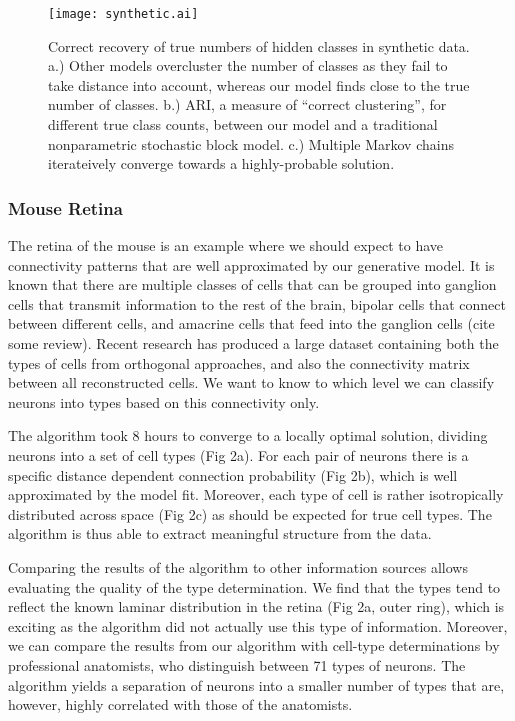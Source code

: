 \documentclass{article}
\begin{document}
\begin{figure}
  \centering 
  \centerline{\texttt{[image: synthetic.ai]}}
  \caption{Correct recovery of true numbers of hidden classes
in synthetic data. a.) Other models overcluster the number
of classes as they fail to take distance into account, whereas
our model finds close to the true number of classes. b.) ARI, a measure
of ``correct clustering'', for
different true class counts, between our model and a traditional
nonparametric stochastic block model. c.) Multiple Markov chains iterateively
converge towards a highly-probable solution. }

\end{figure}

\subsubsection{Mouse Retina}
The retina of the mouse \autocite{Masland2001} is an example where we
should expect to have connectivity patterns that are well approximated
by our generative model. It is known that there are multiple classes
of cells that can be grouped into ganglion cells that transmit
information to the rest of the brain, bipolar cells that connect
between different cells, and amacrine cells that feed into the
ganglion cells (cite some review). Recent research \autocite{Helmstaedter2013} has
produced a large dataset containing both the types of cells from
orthogonal approaches, and also the connectivity matrix between all
reconstructed cells. We want to know to which level we can classify
neurons into types based on this connectivity only.

The algorithm took 8 hours to converge to a locally optimal solution,
dividing neurons into a set of cell types (Fig 2a). For each pair of
neurons there is a specific distance dependent connection probability
(Fig 2b), which is well approximated by the model fit. Moreover, each
type of cell is rather isotropically distributed across space (Fig 2c)
as should be expected for true cell types. The algorithm is thus able
to extract meaningful structure from the data.

Comparing the results of the algorithm to other information sources
allows evaluating the quality of the type determination. We find that
the types tend to reflect the known laminar distribution in the retina
(Fig 2a, outer ring), which is exciting as the algorithm did not
actually use this type of information. Moreover, we can compare the
results from our algorithm with cell-type determinations by
professional anatomists, who distinguish between 71 types of
neurons. The algorithm yields a separation of neurons into a smaller
number of types that are, however, highly correlated with those of the
anatomists.
\end{document}
